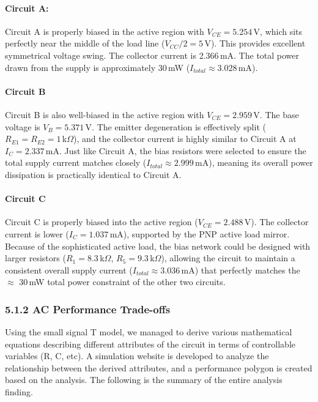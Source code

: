 \documentclass[11pt, a4paper]{article}
\begin{document}
\paragraph{Circuit A: }
Circuit A is properly biased in the active region with $V_{CE} = 5.254$\,V, which sits perfectly near the middle of the load line ($V_{CC}/2 = 5$\,V). This provides excellent symmetrical voltage swing. The collector current is 2.366\,mA. The total power drawn from the supply is approximately 30\,mW ($I_{total} \approx 3.028$\,mA).

\paragraph{Circuit B}
Circuit B is also well-biased in the active region with $V_{CE} = 2.959$\,V. The base voltage is $V_B = 5.371$\,V. The emitter degeneration is effectively split ($R_{E1}=R_{E2}=1$\,k$\Omega$), and the collector current is highly similar to Circuit A at $I_C = 2.337$\,mA. Just like Circuit A, the bias resistors were selected to ensure the total supply current matches closely ($I_{total} \approx 2.999$\,mA), meaning its overall power dissipation is practically identical to Circuit A.

\paragraph{Circuit C}
Circuit C is properly biased into the active region ($V_{CE} = 2.488$\,V). The collector current is lower ($I_C = 1.037$\,mA), supported by the PNP active load mirror. Because of the sophisticated active load, the bias network could be designed with larger resistors ($R_1 = 8.3$\,k$\Omega$, $R_5 = 9.3$\,k$\Omega$), allowing the circuit to maintain a consistent overall supply current ($I_{total} \approx 3.036$\,mA) that perfectly matches the $\approx$ 30\,mW total power constraint of the other two circuits.

\subsubsection*{5.1.2 AC Performance Trade-offs}
Using the small signal T model, we managed to derive various mathematical equations describing different attributes of the circuit in terms of controllable variables (R, C, etc). A simulation website is developed to analyze the relationship between the derived attributes, and a performance polygon is created based on the analysis. The following is the summary of the entire analysis finding.
\end{document}
